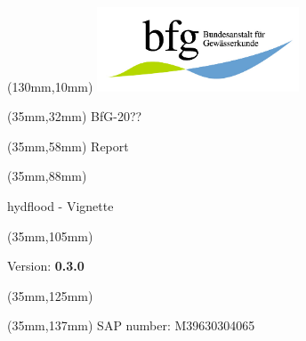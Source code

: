 \begin{titlepage}
    \begin{textblock*}{50mm}(130mm,10mm)
    \includegraphics[width=6cm]{latex/bfg_logo.jpg} %
    \end{textblock*}

    \begin{textblock*}{150mm}(35mm,32mm)
    \huge\noindent
    BfG-20??
    \end{textblock*}

    \begin{textblock*}{150mm}(35mm,58mm)
    \fontsize{30}{35}\selectfont\noindent
    Report
    \end{textblock*}

    \begin{textblock*}{150mm}(35mm,88mm)
    \fontsize{20}{25}\selectfont\noindent
    \begin{center}
    hydflood - Vignette
    \end{center}
    \end{textblock*}

    \begin{textblock*}{150mm}(35mm,105mm)
    \fontsize{15}{17}\selectfont\noindent
    \begin{center}
    Version: \textbf{0.3.0}
    \end{center}
    \end{textblock*}

    \begin{textblock*}{150mm}(35mm,125mm)
    \fontsize{15}{17}\selectfont\noindent
    \mytoday
    \end{textblock*}


    \begin{textblock*}{150mm}(35mm,137mm)
    \fontsize{15}{17}\selectfont\noindent
    SAP number: M39630304065
    \end{textblock*}


\end{titlepage}
